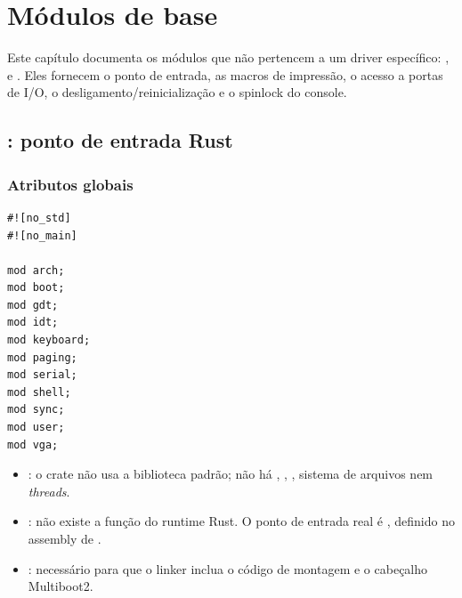 \chapter{M\'odulos de base}
\label{cap:base}

Este cap\'itulo documenta os m\'odulos que n\~ao pertencem a um driver
espec\'ifico: ,  e . Eles fornecem o
ponto de entrada, as macros de impress\~ao, o acesso a portas de I/O, o
desligamento/reinicializa\c{c}\~ao e o spinlock do console.

\section{: ponto de entrada Rust}

\subsection{Atributos globais}

\begin{lstlisting}[caption={Atributos e m\'odulos declarados em \code{main.rs}.},label={lst:mainattrs}]
#![no_std]
#![no_main]

mod arch;
mod boot;
mod gdt;
mod idt;
mod keyboard;
mod paging;
mod serial;
mod shell;
mod sync;
mod user;
mod vga;
\end{lstlisting}

\begin{itemize}
  \item {}: o crate n\~ao usa a biblioteca padr\~ao; n\~ao h\'a
        , , , sistema de arquivos nem
        \emph{threads}.
  \item {}: n\~ao existe a fun\c{c}\~ao  do runtime
        Rust. O ponto de entrada real \'e , definido no
        assembly de .
  \item {}: necess\'ario para que o linker inclua o c\'odigo de
        montagem e o cabe\c{c}alho Multiboot2.
\end{itemize}

\subsection{}

